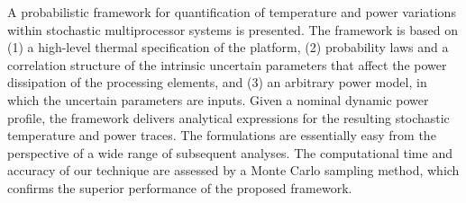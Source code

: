 A probabilistic framework for quantification of temperature and power variations within stochastic multiprocessor systems is presented. The framework is based on (1) a high-level thermal specification of the platform, (2) probability laws and a correlation structure of the intrinsic uncertain parameters that affect the power dissipation of the processing elements, and (3) an arbitrary power model, in which the uncertain parameters are inputs. Given a nominal dynamic power profile, the framework delivers analytical expressions for the resulting stochastic temperature and power traces. The formulations are essentially easy from the perspective of a wide range of subsequent analyses. The computational time and accuracy of our technique are assessed by a Monte Carlo sampling method, which confirms the superior performance of the proposed framework.
